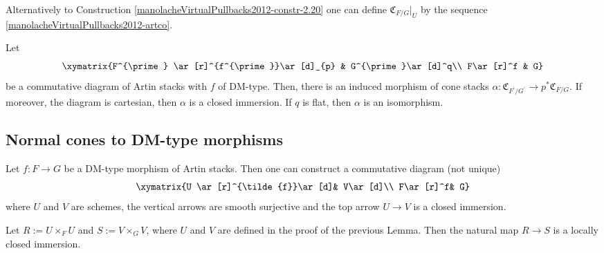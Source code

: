 \begin{remark}\label{manolacheVirtualPullbacks2012-rem-2.25}
 Alternatively to Construction \ref{manolacheVirtualPullbacks2012-constr-2.20} one can define $\mathfrak{C}_{F/G}|_U$ by the sequence \ref{manolacheVirtualPullbacks2012-artco}.
\end{remark}

\begin{proposition}\label{manolacheVirtualPullbacks2012-prop-2.26}
\label{manolacheVirtualPullbacks2012-pullbackofcones}
 Let \begin{equation*}
 \xymatrix {F^{\prime} \ar[r]^{f^{\prime}}\ar[d]_{p} & G^{\prime}\ar[d]^q\\
             F\ar[r]^f & G}
\end{equation*}
be a commutative diagram of Artin stacks with $f$ of DM-type. Then, there is an induced morphism of cone stacks $\alpha:\mathfrak{C}_{F^{\prime}/G^{\prime}}\rightarrow p^*\mathfrak{C}_{F/G}$. If moreover, the diagram is cartesian, then $\alpha$ is a closed immersion. If $q$ is flat, then $\alpha$ is an isomorphism.
\end{proposition}

\subsection{Normal cones to DM-type morphisms}\label{manolacheVirtualPullbacks2012-sec-2.2}

\begin{lemma}\label{manolacheVirtualPullbacks2012-lem-2.27}
\label{manolacheVirtualPullbacks2012-reducetoincl}Let $f:F\to G$ be a DM-type morphism of Artin stacks. Then one can construct a commutative diagram (not unique)
\begin{equation}
 \xymatrix {U \ar[r]^{\tilde{f}}\ar[d]& V\ar[d]\\
             F\ar[r]^f& G}
\end{equation}
where $U$ and $V$ are schemes, the vertical arrows are smooth surjective and the top arrow $U\to V$ is  a closed immersion.
\end{lemma}

\begin{lemma}\label{manolacheVirtualPullbacks2012-lem-2.28}
Let $R:=U\times_{F}U$ and $S:=V\times_{G}V$, where $U$ and $V$ are defined in the proof of the previous Lemma. Then the natural map $R\to S$ is a locally closed immersion.
\end{lemma}

